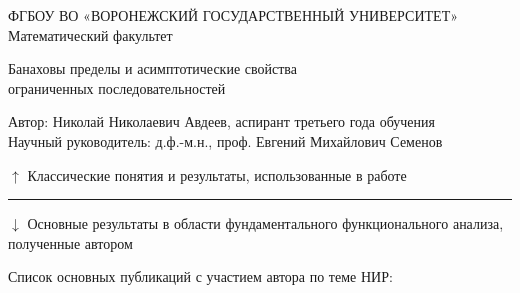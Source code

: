 \documentclass[a4paper,openbib]{report}
\renewcommand{\baselinestretch}{1.17}
\theoremstyle{definition}
\begin{document}
\thispagestyle{empty}
	\Large
	\begin{center}
		ФГБОУ ВО
		«ВОРОНЕЖСКИЙ ГОСУДАРСТВЕННЫЙ УНИВЕРСИТЕТ»
		\\
		Математический факультет
	\end{center}
	\begin{center}
		\Huge
		Банаховы пределы и асимптотические свойства \\ ограниченных последовательностей
	\end{center}
	Автор: Николай Николаевич Авдеев, аспирант третьего года обучения
	\\
	Научный руководитель: д.ф.-м.н., проф. Евгений Михайлович Семенов
	\\
	\nocite{avdeev2021subsets,avdeed2021AandA,our-mz2019measure,avdeev2019space,our-ped-2018-alpha-Tx,our-vzms-2018}

	\noindent
	
	\vfill
	\quad$\uparrow$ Классические понятия и результаты, использованные в работе
	\hrule
	\quad$\downarrow$ Основные результаты в области фундаментального функционального анализа, полученные автором
	\vfill
	\noindent
	
	\hfill
	


	\vfill

	\begin{center}
		Список основных публикаций с участием автора по теме НИР:
	\end{center}

	\renewcommand{\section}[2]{}%
	\renewcommand{\chapter}[2]{}%
	\renewcommand{\baselinestretch}{0.95}
	\printbibliography{}
\end{document}
